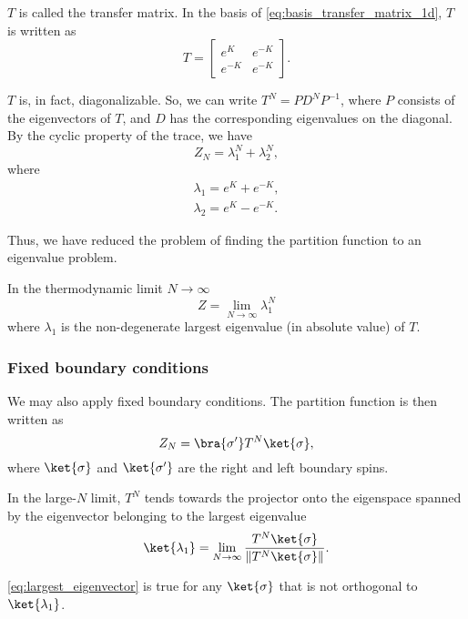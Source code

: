$T$ is called the transfer matrix. In the basis of \autoref{eq:basis_transfer_matrix_1d},
$T$ is written as
\begin{equation}
  T = \begin{bmatrix}
    e^K & e^{-K} \\
    e^{-K} & e^{-K}
  \end{bmatrix}.
\end{equation}

$T$ is, in fact, diagonalizable. So, we can write $T^N = P D^N
P^{-1}$, where $P$ consists of the eigenvectors of $T$, and $D$ has the corresponding eigenvalues on the diagonal. By the cyclic property of the
trace, we have
\begin{equation}
  Z_N = \lambda_{1}^{N} + \lambda_{2}^{N},
\end{equation}
where
\begin{align*}
  \lambda_1 = e^K + e^{-K}, \\
  \lambda_2 = e^K - e^{-K}.
\end{align*}

Thus, we have reduced the problem of finding the partition function to an
eigenvalue problem.

In the thermodynamic limit $N \to \infty$
\begin{equation}
  Z = \lim_{N \to \infty} \lambda_{1}^{N}
\end{equation}
where $\lambda_1$ is the non-degenerate largest eigenvalue (in absolute value) of $T$.

\subsubsection{Fixed boundary conditions}\label{sec:fixed_boundary_conditions}
We may also apply fixed boundary conditions. The partition function is then written as
\begin{equation}
  Z_N = \bra{\sigma'}T^N\ket{\sigma},
\end{equation}
where $\ket{\sigma}$ and $\ket{\sigma'}$ are the right and left boundary spins.

In the large-$N$ limit, $T^N$ tends towards the projector onto the eigenspace spanned by
the eigenvector belonging to the largest eigenvalue
\begin{equation}\label{eq:largest_eigenvector}
  \ket{\lambda_1} = \lim_{N \to \infty} \frac{T^N \ket{\sigma}}{\left\lVert T^N \ket{\sigma} \right\rVert}.
\end{equation}

\autoref{eq:largest_eigenvector} is true for any $\ket{\sigma}$ that is not orthogonal to $\ket{\lambda_1}$.

